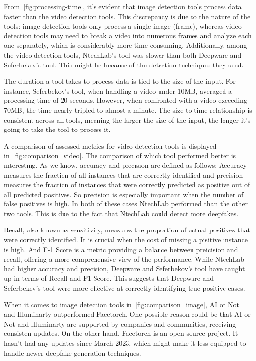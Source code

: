 From~\autoref{fig:processing-time}, it's evident that image detection tools process data faster
than the video detection tools. This discrepancy is due to the nature of the tools:
image detection tools only process a single image (frame), whereas video detection tools may
need to break a video into numerous frames and analyze each one separately, which is considerably
more time-consuming. Additionally, among the video detection tools, NtechLab's tool was slower than
both Deepware and Seferbekov's tool. This might be because of the detection techniques they used.

The duration a tool takes to process data is tied to the size of the input. For instance,
Seferbekov's tool, when handling a video under 10MB, averaged a processing time of 20 seconds. However,
when confronted with a video exceeding 70MB, the time nearly tripled to almost a minute.
The size-to-time relationship is consistent across all tools, meaning the larger the size of the
input, the longer it's going to take the tool to process it.

A comparison of assessed metrics for video detection tools is displayed in~\autoref{fig:comparison_video}.
The comparison of which tool performed better is interesting. As we know, accuracy and precision
are defined as follows: Accuracy measures the fraction of all instances that are correctly
identified and precision measures the fraction of instances that were correctly predicted as
positive out of all predicted positives. So precision is especially important when the number
of false positives is high. In both of these cases NtechLab performed than the other two
tools. This is due to the fact that NtechLab could detect more deepfakes.

Recall, also known as sensitivity, measures the proportion of actual positives that were
correctly identified. It is crucial when the cost of missing a pisitive instance is high.
And F-1 Score is a metric providing a balance between preicision and recall, offering a more
comprehensive view of the performance. While NtechLab had higher accuracy and precision,
Deepware and Seferbekov's tool have caught up in terms of Recall and F1-Score. This suggests that
Deepware and Seferbekov's tool were more effective at correctly identifying true positive cases.

When it comes to image detection tools in~\autoref{fig:comparison_image}, AI or Not and
Illuminarty outperformed Facetorch. One possible reason could be that AI or Not and
Illuminarty are supported by companies and communities, receiving consisten updates.
On the other hand, Facetorch is an open-source project. It hasn't had any updates
since March 2023, which might make it less equipped to handle newer deepfake generation
techniques.

